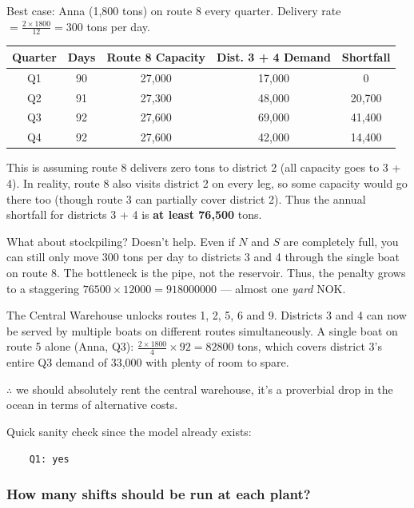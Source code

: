 \documentclass[10pt]{article}
\begin{document}
Best case: Anna (1,800 tons) on route 8 every quarter. Delivery rate $ = \frac{2\times 1800}{12} = 300 $ tons per day. 
\begin{center}
    \begin{tabular}{|c|c|c|c|c|}
        \hline 
        \textbf{Quarter} & \textbf{Days} & \textbf{Route 8 Capacity} & \textbf{Dist. 3 + 4 Demand} & \textbf{Shortfall}\\\hline 
        Q1 & 90 & 27,000 & 17,000 & 0\\\hline 
        Q2 & 91 & 27,300 & 48,000 & 20,700\\\hline 
        Q3 & 92 & 27,600 & 69,000 & 41,400\\\hline 
        Q4 & 92 & 27,600 & 42,000 & 14,400\\\hline 
    \end{tabular}
\end{center}
This is assuming route 8 delivers zero tons to district 2 (all capacity goes to 3 + 4). In reality, route 8 also visits district 2 on every leg, so some capacity would go there too (though route 3 can partially cover district 2). Thus the annual shortfall for districts 3 + 4 is \textbf{at least 76,500} tons. 

What about stockpiling? Doesn't help. Even if $N $ and $S $ are completely full, you can still only move 300 tons per day to districts 3 and 4 through the single boat on route 8. The bottleneck is the pipe, not the reservoir. Thus, the penalty grows to a staggering $76500\times 12000 = 918000000$ --- almost one \textit{yard} NOK.

The Central Warehouse unlocks routes 1, 2, 5, 6 and 9. Districts 3 and 4 can now be served by multiple boats on different routes simultaneously. A single boat on route 5 alone (Anna, Q3): $\frac{2\times1800}{4}\times 92 = 82800 $ tons, which covers district 3's entire Q3 demand of 33,000 with plenty of room to spare.

$\therefore $ we should absolutely rent the central warehouse, it's a proverbial drop in the ocean in terms of alternative costs.

Quick sanity check since the model already exists: 
\begin{verbatim}
    Q1: yes
\end{verbatim}
\newpage
\subsubsection{How many shifts should be run at each plant?}
\end{document}
